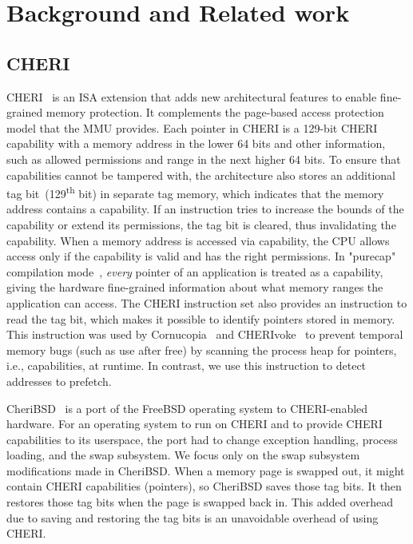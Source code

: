 \section{Background and Related work} \label{sec:2}
\subsection{CHERI}
CHERI~\cite{cheri, cheri-technical-manual} is an ISA extension that adds new architectural features to enable fine-grained memory protection. 
It complements the page-based access protection model that the MMU provides.
Each pointer in CHERI is a 129-bit CHERI capability with a memory address 
in the lower 64 bits and other information, such as allowed permissions and range in the next higher 64 bits.
To ensure that capabilities cannot be tampered with, 
the architecture also stores an additional tag bit~(129\textsuperscript{th} bit) in separate tag memory, 
which indicates that the memory address contains a capability.
If an instruction tries to increase the bounds of the capability or extend its permissions, 
the tag bit is cleared, thus invalidating the capability.
When a memory address is accessed via capability, 
the CPU allows access only if the capability is valid and has the right permissions.
In "purecap" compilation mode~\cite{cheri_prog_guide}, \textit{every} pointer of an application is treated as a capability, giving the hardware fine-grained information about what memory ranges the application can access.
The CHERI instruction set also provides an instruction to read the tag bit, 
which makes it possible to identify pointers stored in memory. 
This instruction was used by Cornucopia~\cite{cornucopia} and CHERIvoke~\cite{cherivoke} to prevent temporal memory bugs (such as use after free) by scanning the process heap for pointers, i.e., capabilities, at runtime.
In contrast, we use this instruction to detect addresses to prefetch.

CheriBSD~\cite{cheribsd} is a port of the FreeBSD operating system to CHERI-enabled hardware.
For an operating system to run on CHERI and to provide CHERI capabilities to its 
userspace, the port had to change exception handling, process loading, and the swap subsystem.
We focus only on the swap subsystem modifications made in CheriBSD. 
When a memory page is swapped out, it might contain CHERI capabilities (pointers), so
CheriBSD saves those tag bits.
It then restores those tag bits when the page is swapped back in.
This added overhead due to saving and restoring the tag bits is 
an unavoidable overhead of using CHERI.

